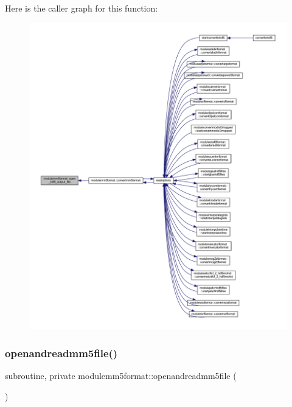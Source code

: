 Here is the caller graph for this function\+:\nopagebreak
\begin{figure}[H]
\begin{center}
\leavevmode
\includegraphics[width=350pt]{namespacemodulemm5format_aeb412a3427b8b95fd51d277cd343e346_icgraph}
\end{center}
\end{figure}
\mbox{\label{namespacemodulemm5format_a4a978d934b39be4e1dd62a5701e05c93}} 
\subsubsection{\texorpdfstring{openandreadmm5file()}{openandreadmm5file()}}
{\footnotesize\ttfamily subroutine, private modulemm5format\+::openandreadmm5file (\begin{DoxyParamCaption}{ }\end{DoxyParamCaption})\hspace{0.3cm}{\ttfamily [private]}}

